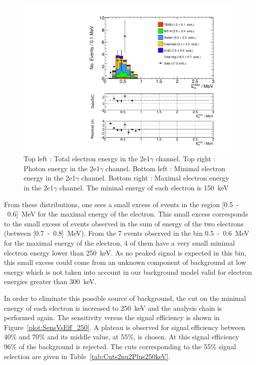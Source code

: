 \documentclass[main.tex]{subfiles}
\begin{document}
\begin{figure} [h!]
\begin{center}
\includegraphics[scale=0.37]{pictures/FinalResults/bb2nu2/150/Eemax_bb2nu2NS.pdf}
\end{center}
\caption{Top left : Total electron energy in the 2e1$\gamma$ channel. Top right : Photon energy in the 2e1$\gamma$ channel. Bottom left : Minimal electron energy in the 2e1$\gamma$ channel. Bottom right : Maximal electron energy in the 2e1$\gamma$ channel. The mininal energy of each electron is 150~keV}
\label{plot:SEeAndEg250bb2nu2_150}
\end{figure}


\FloatBarrier


\NI From these distributions, one sees a small excess of events in the region [0.5~-~0.6]~MeV for the maximal energy of the electron. This small excess corresponds to the small excess of events observed in the sum of energy of the two electrons (between [0.7~-~0.8]~MeV). From the 7 events observed in the bin 0.5~-~0.6~MeV for the maximal energy of the electron, 4 of them have a very small minimal electron energy lower than 250~keV. As no peaked signal is expected in this bin, this small excess could come from an unknown component of background at low energy which is not taken into account in our background model valid for electron energies greater than 300~keV. 


\bigskip


\NI In order to eliminate this possible source of background, the cut on the minimal energy of each electron is increased to 250~keV and the analysis chain is performed again. The sensitivity versus the signal efficiency is shown in Figure~\ref{plot:SensVsEff_250}. A plateau is observed for signal efficiency between 40\% and 70\% and its middle value, at 55\%, is chosen. At this signal efficiency 96\% of the background is rejected. The cuts corresponding to the 55\% signal selection are given in Table~\ref{tab:Cuts2nu2Plus250keV}.
\end{document}
